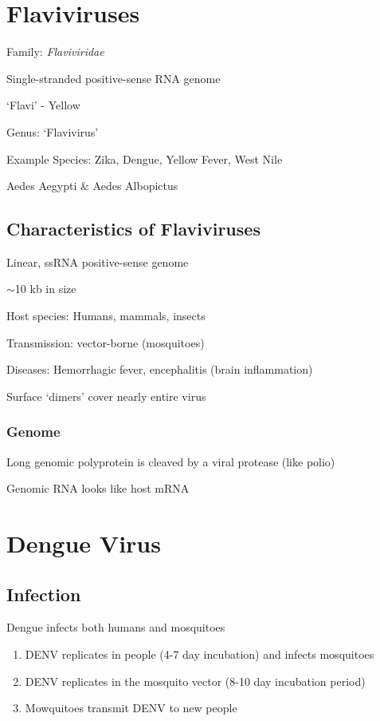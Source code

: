 \documentclass{notes}
\begin{document}
\section{Flaviviruses}

Family: \textit{Flaviviridae}

Single-stranded positive-sense RNA genome

\tab `Flavi' - Yellow

Genus: `Flavivirus'

Example Species: Zika, Dengue, Yellow Fever, West Nile

\tab Aedes Aegypti \& Aedes Albopictus

\subsection{Characteristics of Flaviviruses}

Linear, ssRNA positive-sense genome

\tab \(\sim\)10 kb in size

Host species: Humans, mammals, insects

Transmission: vector-borne (mosquitoes)

Diseases: Hemorrhagic fever, encephalitis (brain inflammation)

\tab Surface `dimers' cover nearly entire virus


\subsubsection{Genome}

Long genomic polyprotein is cleaved by a viral protease (like polio)

Genomic RNA looks like host mRNA

\section{Dengue Virus}

\subsection{Infection}

Dengue infects both humans and mosquitoes

\begin{enumerate}
    \item DENV replicates in people (4-7 day incubation) and infects mosquitoes
    \item DENV replicates in the mosquito vector (8-10 day incubation period)
    \item Mowquitoes transmit DENV to new people
\end{enumerate}
\end{document}
